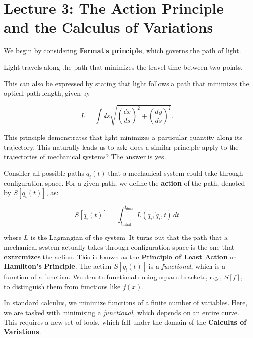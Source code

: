 \section{Lecture 3: The Action Principle and the Calculus of Variations}

We begin by considering \textbf{Fermat's principle}, which governs the path of light.

\begin{definition}
    Light travels along the path that minimizes the travel time between two points.
\end{definition}

This can also be expressed by stating that light follows a path that minimizes the 
optical path length, given by 

\begin{equation}
    L = \int ds \sqrt{\left(\frac{dx}{ds}\right)^2 + \left(\frac{dy}{ds}\right)^2}.
    \label{eq:optical_path_length}
\end{equation}

This principle demonstrates that light minimizes a particular quantity along its 
trajectory. This naturally leads us to ask: does a similar principle apply to the 
trajectories of mechanical systems?  The answer is yes.

Consider all possible paths $q_i(t)$ that a mechanical system could take through 
configuration space. For a given path, we define the \textbf{action} of the path, denoted 
by $S[q_i(t)]$, as:

\begin{equation}
    S[q_i(t)] = \int_{t_{\text{initial}}}^{t_{\text{final}}} L(q_i, \dot{q}_i, t) \, dt
    \label{eq:action_definition}
\end{equation}

where $L$ is the Lagrangian of the system.  It turns out that the path that a mechanical
system actually takes through configuration space is the one that \textbf{extremizes} the 
action. This is known as the \textbf{Principle of Least Action} or 
\textbf{Hamilton's Principle}. The action $S[q_i(t)]$ is a \textit{functional}, which is 
a function of a function. We denote functionals using square brackets, e.g., $S[f]$, to 
distinguish them from functions like $f(x)$.

In standard calculus, we minimize functions of a finite number of variables. Here, we 
are tasked with minimizing a \textit{functional}, which depends on an entire curve. 
This requires a new set of tools, which fall under the domain of the 
\textbf{Calculus of Variations}.


